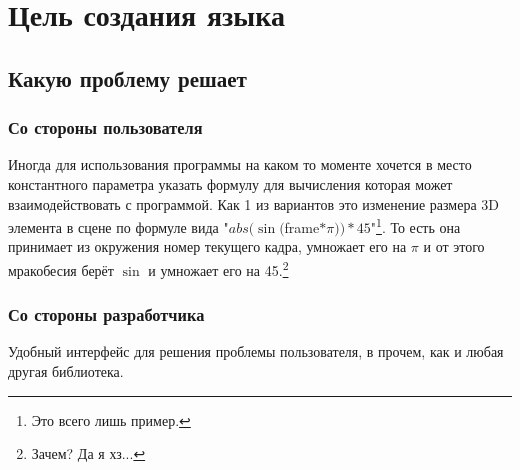 \documentclass[../Language-declaration.tex]{subfiles}
\begin{document}
    \chapter{Цель создания языка}

        \section{Какую проблему решает}
            \subsection{Со стороны пользователя}
                Иногда для использования программы на каком то моменте хочется в место константного параметра указать формулу для вычисления которая может взаимодействовать с программой. Как 1 из вариантов это изменение размера 3D элемента в сцене по формуле вида "$abs(\sin($frame$*\pi))*45$"\footnote{Это всего лишь пример.}. То есть она принимает из окружения номер текущего кадра, умножает его на $\pi$ и от этого мракобесия берёт $\sin$ и умножает его на 45.\footnote{Зачем? Да я хз...}

            \subsection{Со стороны разработчика}
                Удобный интерфейс для решения проблемы пользователя, в прочем, как и любая другая библиотека.
\end{document}
